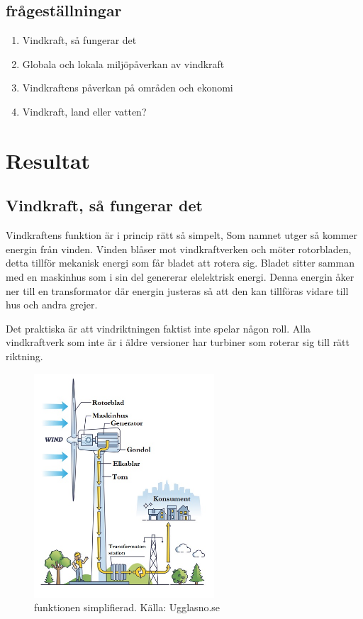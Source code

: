 \documentclass[11p]{article}
\begin{document}
    \subsection{frågeställningar}
    \begin{enumerate}
        \item Vindkraft, så fungerar det
        \item Globala och lokala miljöpåverkan av vindkraft
        \item Vindkraftens påverkan på områden och ekonomi
        \item Vindkraft, land eller vatten?
    \end{enumerate}

    \section{Resultat}

    \subsection{Vindkraft, så fungerar det}

  Vindkraftens funktion är i princip rätt så simpelt, Som namnet utger så kommer energin från vinden.
  Vinden blåser mot vindkraftverken och möter rotorbladen, detta tillför mekanisk energi som får
  bladet att rotera sig.
  Bladet sitter samman med en maskinhus som i sin del genererar elelektrisk
  energi.
  Denna energin åker ner till en transformator där energin justeras så att den kan tillföras
  vidare till hus och andra grejer.

  Det praktiska är att vindriktningen faktist inte spelar någon  roll.
   Alla vindkraftverk som inte är i äldre versioner har turbiner som roterar sig till rätt riktning.
    \begin{figure}
        \includegraphics[width=0.6\textwidth]{../images/vindhur.jpg}
        \caption{funktionen simplifierad. Källa: Ugglasno.se}
    \end{figure}
\end{document}
